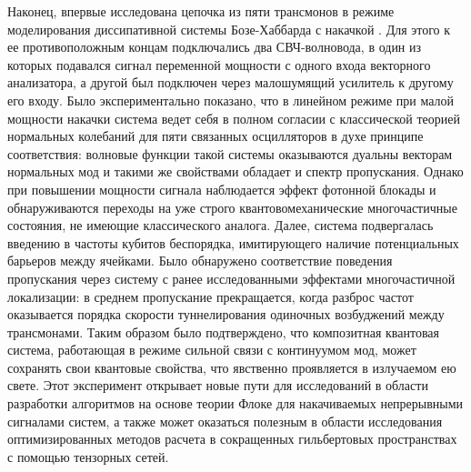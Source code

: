 \documentclass[14pt, a4paper]{extarticle}
\begin{document}
Наконец, впервые исследована цепочка из пяти трансмонов в режиме моделирования диссипативной системы Бозе-Хаббарда с накачкой . Для этого к ее противоположным концам подключались два СВЧ-волновода, в один из которых подавался сигнал переменной мощности с одного входа векторного анализатора, а другой был подключен через малошумящий усилитель к другому его входу. Было экспериментально показано, что в линейном режиме при малой мощности накачки система ведет себя в полном согласии с классической теорией нормальных колебаний для пяти связанных осцилляторов в духе принципе соответствия: волновые функции такой системы оказываются дуальны векторам нормальных мод и такими же свойствами обладает и спектр пропускания. Однако при повышении мощности сигнала наблюдается эффект фотонной блокады и обнаруживаются переходы на уже строго квантовомеханические многочастичные состояния, не имеющие классического аналога. Далее, система подвергалась введению в частоты кубитов беспорядка, имитирующего наличие потенциальных барьеров между ячейками. Было обнаружено соответствие поведения пропускания через систему с ранее исследованными эффектами многочастичной локализации: в среднем пропускание прекращается, когда разброс частот оказывается порядка скорости туннелирования одиночных возбуджений между трансмонами. Таким образом было подтверждено, что композитная квантовая система, работающая в режиме сильной связи с континуумом мод, может сохранять свои квантовые свойства, что явственно проявляется в излучаемом ею свете. Этот эксперимент открывает новые пути для исследований в области разработки алгоритмов на основе теории Флоке для накачиваемых непрерывными сигналами систем, а также может оказаться полезным в области исследования оптимизированных методов расчета в сокращенных гильбертовых пространствах с помощью тензорных сетей.

\continuouslabelsfalse
{}






\end{document}
